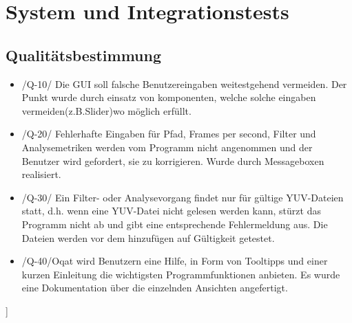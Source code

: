 \chapter{System und Integrationstests}
\section{Qualitätsbestimmung}
\begin{itemize}
\item /Q-10/ Die GUI soll falsche Benutzereingaben weitestgehend vermeiden. \newline
Der Punkt wurde durch einsatz von komponenten, welche solche eingaben vermeiden(z.B.Slider)wo möglich erfüllt.
\item /Q-20/ Fehlerhafte Eingaben für Pfad, Frames per second, Filter und Analysemetriken werden vom Programm nicht angenommen und der Benutzer wird gefordert, sie zu korrigieren. \newline
Wurde durch Messageboxen realisiert.
\item /Q-30/ Ein Filter- oder Analysevorgang findet nur für gültige YUV-Dateien statt, d.h. wenn eine YUV-Datei nicht gelesen werden kann, stürzt das Programm nicht ab und gibt eine entsprechende Fehlermeldung aus. \newline
Die Dateien werden vor dem hinzufügen auf Gültigkeit getestet.
\item  /Q-40/Oqat wird Benutzern eine Hilfe, in Form von Tooltipps und einer kurzen Einleitung die wichtigsten Programmfunktionen anbieten. \newline
Es wurde eine Dokumentation über die einzelnden Ansichten angefertigt.

\end{itemize}]
